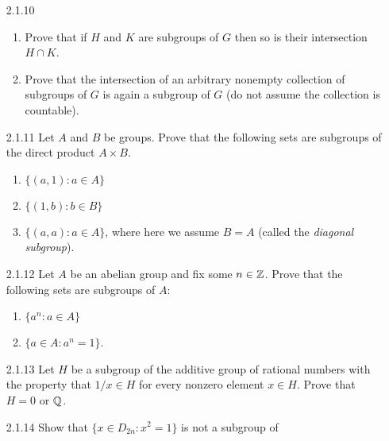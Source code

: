 \begin{enumerate}
   \item[2.1.10]  \begin{enumerate}
                     \item Prove that if $H$ and $K$ are subgroups of $G$ then
                           so is their intersection $H \cap K$.
                     \item Prove that the intersection of an arbitrary nonempty
                           collection of subgroups of $G$ is again a subgroup of
                           $G$ (do not assume the collection is countable).
                  \end{enumerate}
   \item[2.1.11]  Let $A$ and $B$ be groups. Prove that the following sets are
                  subgroups of the direct product $A \times B$.
                  \begin{enumerate}
                     \item $\{(a, 1) : a \in A\}$
                     \item $\{(1, b) : b \in B\}$
                     \item $\{(a, a) : a \in A\}$, where here we assume $B = A$
                           (called the \textit{diagonal subgroup}).
                  \end{enumerate}
   \item[2.1.12]  Let $A$ be an abelian group and fix some $n \in \mathbb{Z}$. Prove
                  that the following sets are subgroups of $A$:
                  \begin{enumerate}
                     \item $\{a^n : a \in A\}$
                     \item $\{a \in A : a^n = 1\}$.
                  \end{enumerate}
   \item[2.1.13]  Let $H$ be a subgroup of the additive group of rational
                  numbers with the property that $1/x \in H$ for every nonzero
                  element $x \in H$. Prove that $H = 0$ or $\mathbb{Q}$.
   \item[2.1.14]  Show that $\{x \in D_{2n} : x^2 = 1\}$ is not a subgroup of

\end{enumerate}
